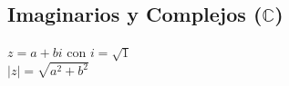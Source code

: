 \subsection{Imaginarios y Complejos ($\mathbb{C}$)}
$ z = a + bi $ con $ i = \sqrt{1} $\\
$\mid z \mid = \sqrt{a^2 + b^2}$\\
